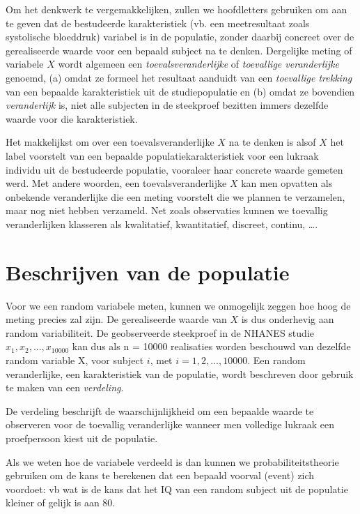 \documentclass[
  12pt,dutch,coursenotes]{book}
\theoremstyle{definition}
\theoremstyle{definition}
\theoremstyle{definition}
\theoremstyle{definition}
\theoremstyle{remark}
\begin{document}
Om het denkwerk te vergemakkelijken, zullen we hoofdletters gebruiken om aan te geven dat
de bestudeerde karakteristiek (vb. een meetresultaat zoals systolische bloeddruk) variabel is in de populatie,
zonder daarbij concreet over de gerealiseerde waarde
voor een bepaald subject na te denken.
Dergelijke meting of variabele \(X\) wordt
algemeen een \emph{toevalsveranderlijke} of \emph{toevallige veranderlijke} genoemd, (a) omdat ze formeel het
resultaat aanduidt van een \emph{toevallige trekking} van een bepaalde
karakteristiek uit de studiepopulatie en (b) omdat ze bovendien \emph{veranderlijk} is,
niet alle subjecten in de steekproef bezitten immers dezelfde waarde
voor die karakteristiek.

Het makkelijkst om over een toevalsveranderlijke \(X\) na te denken is alsof \(X\) het label voorstelt van
een bepaalde populatiekarakteristiek voor een lukraak individu uit de
bestudeerde populatie, vooraleer haar concrete waarde gemeten werd.
Met andere woorden, een toevalsveranderlijke \(X\) kan men opvatten als onbekende veranderlijke die een meting voorstelt die we plannen te verzamelen, maar nog niet hebben verzameld.
Net zoals observaties kunnen we toevallig veranderlijken klasseren als kwalitatief, kwantitatief, discreet, continu, \ldots.

\hypertarget{beschrijven-van-de-populatie}{%
\section{Beschrijven van de populatie}\label{beschrijven-van-de-populatie}}

Voor we een random variabele meten, kunnen we onmogelijk zeggen hoe hoog de meting precies zal zijn.
De gerealiseerde waarde van \(X\) is dus onderhevig aan random variabiliteit.
De geobserveerde steekproef in de NHANES studie \(x_1, x_2, . . . , x_{10000}\) kan dus als n = 10000 realisaties worden beschouwd van dezelfde random variable X, voor subject \(i\), met \(i = 1,2,...,10000\).
Een random veranderlijke, een karakteristiek van de populatie, wordt beschreven door gebruik te maken van een \emph{verdeling}.

De verdeling beschrijft de waarschijnlijkheid om een bepaalde waarde te observeren voor de toevallig veranderlijke wanneer men volledige lukraak een proefpersoon kiest uit de populatie.

Als we weten hoe de variabele verdeeld is dan kunnen we probabiliteitstheorie gebruiken om de kans te berekenen dat een bepaald voorval (event) zich voordoet: vb wat is de kans dat het IQ van een random subject uit de populatie kleiner of gelijk is aan 80.
\end{document}
